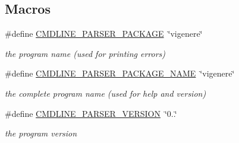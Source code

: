 \subsection*{Macros}
\begin{DoxyCompactItemize}
\item 
\mbox{\label{vigenere-getopt_8h_aeb847973552c32bcbe5f14973a0a8a32}} 
\#define \hyperlink{vigenere-getopt_8h_aeb847973552c32bcbe5f14973a0a8a32}{C\+M\+D\+L\+I\+N\+E\+\_\+\+P\+A\+R\+S\+E\+R\+\_\+\+P\+A\+C\+K\+A\+GE}~\char`\"{}vigenere\char`\"{}
\begin{DoxyCompactList}\small\item\em the program name (used for printing errors) \end{DoxyCompactList}\item 
\mbox{\label{vigenere-getopt_8h_ae2f94765d0d8758ddf6b326a4806d6ff}} 
\#define \hyperlink{vigenere-getopt_8h_ae2f94765d0d8758ddf6b326a4806d6ff}{C\+M\+D\+L\+I\+N\+E\+\_\+\+P\+A\+R\+S\+E\+R\+\_\+\+P\+A\+C\+K\+A\+G\+E\+\_\+\+N\+A\+ME}~\char`\"{}vigenere\char`\"{}
\begin{DoxyCompactList}\small\item\em the complete program name (used for help and version) \end{DoxyCompactList}\item 
\mbox{\label{vigenere-getopt_8h_a1eeca7dc254bf6867ba9635f45771471}} 
\#define \hyperlink{vigenere-getopt_8h_a1eeca7dc254bf6867ba9635f45771471}{C\+M\+D\+L\+I\+N\+E\+\_\+\+P\+A\+R\+S\+E\+R\+\_\+\+V\+E\+R\+S\+I\+ON}~\char`\"{}0..\char`\"{}
\begin{DoxyCompactList}\small\item\em the program version \end{DoxyCompactList}\end{DoxyCompactItemize}
